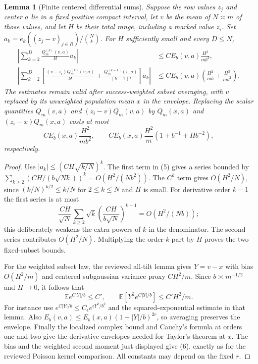 \documentclass[11pt]{article}
\newtheorem{lemma}{Lemma}\newtheorem{theorem}{Theorem}
\newcommand{\E}{\mathbb E}
\begin{document}
\begin{lemma}[Finite centered differential sums]\label{polar}
Suppose the row values $z_j$ and center $a$ lie in a fixed positive
compact interval, let $v$ be the mean of $N\asymp m$ of those values,
and let $H$ be their total range, including a marked value $z_i$.
Set $a_k=e_k((z_j-v)_{j\in R})/\binom Nk$.
For $H$ sufficiently small and every $D\le N$,
\begin{align*}
 \left|\sum_{k=2}^D\frac{Q_m^{(k)}(v,a)}{k!}a_k\right|
 &\le C E_b(v,a)\frac{H^2}{mb^2},\\
 \left|\sum_{k=2}^D
 \left[\frac{(v-z_i)Q_m^{(k)}(v,a)}{k!}
       +\frac{Q_m^{(k-1)}(v,a)}{(k-1)!}\right]a_k\right|
 &\le C E_b(v,a)
             \left(\frac{H^2}{mb}+\frac{H^3}{mb^2}\right).
\end{align*}
The estimates remain valid after success-weighted subset averaging,
with $v$ replaced by its unweighted population mean $x$ in the
envelope. Replacing the scalar quantities $Q_m(v,a)$ and
$(z_i-v)Q_m(v,a)$ by $Q_m(x,a)$ and $(z_i-x)Q_m(x,a)$ costs at most
\[
 C E_b(x,a)\frac{H^2}{mb^2},\qquad
 C E_b(x,a)\frac{H^2}{m}(1+b^{-1}+Hb^{-2}),               \tag{6}
\]
respectively.
\end{lemma}
\begin{proof}
Use $|a_k|\le(CH\sqrt{k/N})^k$. The first term in (5) gives a series
bounded by
$\sum_{k\ge2}(CH/(b\sqrt{Nk}))^k=O(H^2/(Nb^2))$.
The $C^k$ term gives $O(H^2/N)$, since
$(k/N)^{k/2}\le k/N$ for $2\le k\le N$ and $H$ is small.
For derivative order $k-1$ the first series is at most
\[
 \frac{CH}{\sqrt N}
    \sum_{k\ge2}\sqrt{k}
             \left(\frac{CH}{b\sqrt N}\right)^{k-1}
 =O(H^2/(Nb));
\]
this deliberately weakens the extra powers of $k$ in the denominator.
The second series contributes $O(H^2/N)$.
Multiplying the order-$k$ part by $H$ proves the two fixed-subset bounds.

For the weighted subset law, the reviewed all-tilt lemma gives
$Y=v-x$ with bias $O(H^2/m)$ and centered subgaussian variance proxy
$CH^2/m$. Since $b\asymp m^{-1/2}$ and $H\to0$, it follows that
\[
 \E e^{C|Y|/b}\le C',\qquad
 \E[Y^2e^{C|Y|/b}]\le C'H^2/m.
\]
For instance use $e^{C|Y|/b}\le C_\epsilon e^{\epsilon Y^2/b^2}$
and the squared-exponential estimate in that lemma.
Also $E_b(v,a)\le E_b(x,a)(1+|Y|/b)^{2r}$, so averaging preserves
the envelope. Finally the localized complex bound and Cauchy's
formula at orders one and two give the derivative envelopes needed
for Taylor's theorem at $x$. The bias and the weighted second
moment just displayed give (6), exactly as for the reviewed Poisson
kernel comparison. All constants may depend on the fixed $r$.
\end{proof}
\end{document}
